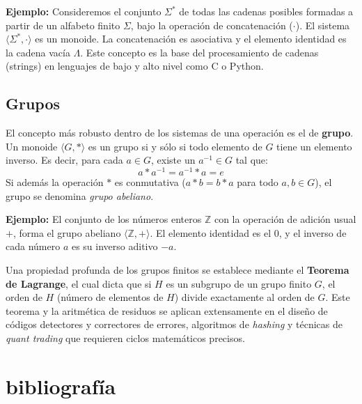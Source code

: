 \documentclass[12pt, letterpaper]{article}
\begin{document}
\textbf{Ejemplo:} Consideremos el conjunto $\Sigma^*$ de todas las cadenas posibles formadas a partir de un alfabeto finito $\Sigma$, bajo la operación de concatenación ($\cdot$). El sistema $\langle \Sigma^*, \cdot \rangle$ es un monoide. La concatenación es asociativa y el elemento identidad es la cadena vacía $\Lambda$. Este concepto es la base del procesamiento de cadenas (strings) en lenguajes de bajo y alto nivel como C o Python.

\subsection{Grupos}
El concepto más robusto dentro de los sistemas de una operación es el de \textbf{grupo}. Un monoide $\langle G, * \rangle$ es un grupo si y sólo si todo elemento de $G$ tiene un elemento inverso. Es decir, para cada $a \in G$, existe un $a^{-1} \in G$ tal que:
$$a * a^{-1} = a^{-1} * a = e$$
Si además la operación $*$ es conmutativa ($a * b = b * a$ para todo $a, b \in G$), el grupo se denomina \textit{grupo abeliano}.

\textbf{Ejemplo:} El conjunto de los números enteros $\mathbb{Z}$ con la operación de adición usual $+$, forma el grupo abeliano $\langle \mathbb{Z}, + \rangle$. El elemento identidad es el $0$, y el inverso de cada número $a$ es su inverso aditivo $-a$. 

Una propiedad profunda de los grupos finitos se establece mediante el \textbf{Teorema de Lagrange}, el cual dicta que si $H$ es un subgrupo de un grupo finito $G$, el orden de $H$ (número de elementos de $H$) divide exactamente al orden de $G$. Este teorema y la aritmética de residuos se aplican extensamente en el diseño de códigos detectores y correctores de errores, algoritmos de \textit{hashing} y técnicas de \textit{quant trading} que requieren ciclos matemáticos precisos.

\section{bibliografía}
\vspace{-0.7cm}
\renewcommand{\refname}{}


\end{document}
